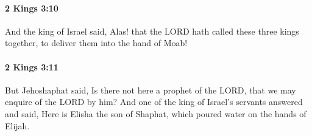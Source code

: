 		\paragraph{2 Kings 3:10} %
			\label{2KINGS-3-10}

			And the king of Israel said, Alas! that the LORD hath called these three kings together, to deliver them into the hand of Moab!


		\paragraph{2 Kings 3:11} %
			\label{2KINGS-3-11}

			But Jehoshaphat said, Is there not here a prophet of the LORD, that we may enquire of the LORD by him? And one of the king of Israel’s servants answered and said, Here is Elisha the son of Shaphat, which poured water on the hands of Elijah.


